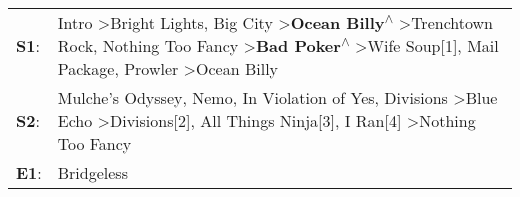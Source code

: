 \begin{supertabular}{p{0.03\textwidth}p{0.92\textwidth}}
 \textbf{S1}:  &  Intro\textsuperscript{} \textgreater \enspace Bright Lights, Big City\textsuperscript{} \textgreater \enspace \textbf{Ocean Billy\textsuperscript{$\wedge$}} \textgreater \enspace Trenchtown Rock\textsuperscript{}, \enspace Nothing Too Fancy\textsuperscript{} \textgreater \enspace \textbf{Bad Poker\textsuperscript{$\wedge$}} \textgreater \enspace Wife Soup[1]\textsuperscript{}, \enspace Mail Package\textsuperscript{}, \enspace Prowler\textsuperscript{} \textgreater \enspace Ocean Billy\textsuperscript{}  \enspace  \\
 \textbf{S2}:  &                                                                                                              Mulche's Odyssey\textsuperscript{}, \enspace Nemo\textsuperscript{}, \enspace In Violation of Yes\textsuperscript{}, \enspace Divisions\textsuperscript{} \textgreater \enspace Blue Echo\textsuperscript{} \textgreater \enspace Divisions[2]\textsuperscript{}, \enspace All Things Ninja[3]\textsuperscript{}, \enspace I Ran[4]\textsuperscript{} \textgreater \enspace Nothing Too Fancy\textsuperscript{}  \enspace  \\
 \textbf{E1}:  &                                                                                                                                                                                                                                                                                                                                                                                                                                                                                                 Bridgeless\textsuperscript{}  \enspace  \\
\end{supertabular}
